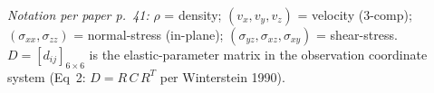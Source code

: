 \noindent\textit{Notation per paper p.~41:}
$\rho$ = density;
$(v_x, v_y, v_z)$ = velocity (3-comp);
$(\sigma_{xx}, \sigma_{zz})$ = normal-stress (in-plane);
$(\sigma_{yz}, \sigma_{xz}, \sigma_{xy})$ = shear-stress.
$D = [d_{ij}]_{6\times 6}$ is the elastic-parameter matrix in the observation
coordinate system (Eq~2: $D = R\,C\,R^T$ per Winterstein 1990).
